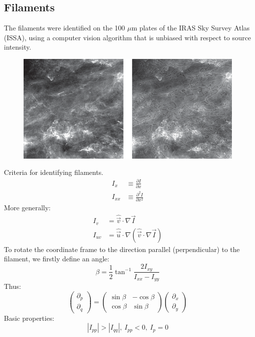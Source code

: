 \documentclass[12pt]{article}
\begin{document}
    \subsection{Filaments} %
    \label{sub:filaments}
    The filaments were identified on the 100 $\mu$m plates of the IRAS Sky Survey Atlas (ISSA), using a computer vision algorithm that is unbiased with respect to source intensity.\cite{2003ApJS..149..365J}
        \begin{figure}[hb]
                  \centering
                  \includegraphics[totalheight=60 mm]{img/Jackson.eps}
        \end{figure} 
    \clearpage
    Criteria for identifying filaments.
    \begin{align}
        I_x &\equiv \frac{\partial I}{\partial x}\\
        I_{xx} &\equiv \frac{\partial^2 I}{\partial x^2}
    \end{align}
    More generally:
    \begin{align}
        I_v &= \hat{\vec{v}}\cdot \nabla \vec{I}\\
        I_{uv} &= \hat{\vec{u}}\cdot \nabla(\hat{\vec{v}}\cdot \nabla \vec{I})
    \end{align}
    \clearpage
    To rotate the coordinate frame to the direction parallel (perpendicular) to the filament, we firstly define an angle:
    \begin{equation}
        \beta  = \frac{1}{2} \tan ^{-1} \frac{2I_{xy}}{I_{xx}-I_{yy}}
    \end{equation}
    Thus:
    \begin{equation}
        \left(\begin{array}{c}
            \partial_p\\
            \partial_q
        \end{array}\right)
        =
        \left(\begin{array}{rr}
            \sin \beta & -\cos \beta\\
            \cos \beta & \sin \beta
        \end{array}\right)
        \left(\begin{array}{c}
            \partial_x\\
            \partial_y
        \end{array}\right)
    \end{equation}
    Basic properties:
    \begin{equation}
        |I_{pp}|>|I_{qq}|,\ I_{pp}<0,\ I_p=0
    \end{equation}
\clearpage
\end{document}
